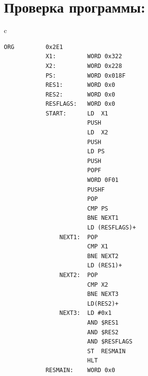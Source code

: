 \section{Проверка программы:}
\begin{center}
    \begin{tabular}{c}
        \begin{lstlisting}[basicstyle=\ttfamily\tiny]
            ORG         0x2E1
            X1:         WORD 0x322
            X2:         WORD 0x228
            PS:         WORD 0x018F
            RES1:       WORD 0x0
            RES2:       WORD 0x0
            RESFLAGS:   WORD 0x0
            START:      LD  X1
                        PUSH
                        LD  X2
                        PUSH
                        LD PS
                        PUSH
                        POPF
                        WORD 0F01
                        PUSHF
                        POP
                        CMP PS
                        BNE NEXT1
                        LD (RESFLAGS)+
                NEXT1:  POP
                        CMP X1
                        BNE NEXT2
                        LD (RES1)+
                NEXT2:  POP
                        CMP X2
                        BNE NEXT3
                        LD(RES2)+
                NEXT3:  LD #0x1
                        AND $RES1
                        AND $RES2
                        AND $RESFLAGS
                        ST  RESMAIN
                        HLT
            RESMAIN:    WORD 0x0
        \end{lstlisting}
    \end{tabular}
\end{center}


